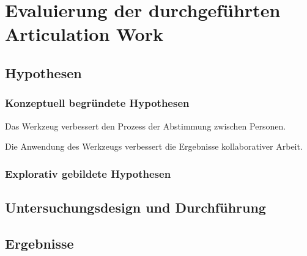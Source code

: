 \chapter{Evaluierung der durchgeführten Articulation Work} %
\label{cha:eval_aw}

\section{Hypothesen} %
\label{sec:a_hypothesen}

\subsection{Konzeptuell begründete Hypothesen} %
\label{sub:a_konzeptuell_begründete_hypothesen}

\begin{hyp}
	Das Werkzeug verbessert den Prozess der Abstimmung zwischen Personen.
\end{hyp}

\begin{hyp}
	Die Anwendung des Werkzeugs verbessert die Ergebnisse kollaborativer Arbeit.
\end{hyp}


\subsection{Explorativ gebildete Hypothesen} %
\label{sub:a_explorativ_gebildete_hypothesen}



\section{Untersuchungsdesign und Durchführung} %
\label{sec:a_untersuchungsdesign}


\section{Ergebnisse} %
\label{sec:a_ergebnisse}


